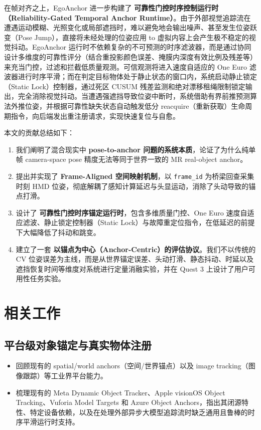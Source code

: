 \documentclass[review]{vgtc}
\begin{document}
在帧对齐之上，EgoAnchor 进一步构建了 \textbf{可靠性门控时序控制运行时（Reliability-Gated Temporal Anchor Runtime）}。由于外部视觉追踪流在遭遇运动模糊、光照变化或局部遮挡时，难以避免地会输出噪声、甚至发生位姿跃变（Pose Jump），直接将未经处理的位姿应用 to 虚拟内容上会产生极不稳定的视觉抖动。EgoAnchor 运行时不依赖复杂的不可预测的时序滤波器，而是通过协同设计多维度的可靠性评分（结合重投影颜色误差、掩膜内深度有效比例及残差等）来充当门控，过滤和拦截低质量观测。可信观测将进入速度自适应的 One Euro 滤波器进行时序平滑；而在判定目标物体处于静止状态的窗口内，系统启动静止锁定（Static Lock）控制器，通过死区 CUSUM 残差监测和绝对漂移租绳限制锁定输出，完全消除视觉抖动。当遭遇强遮挡导致位姿中断时，系统借助有界前推预测算法外推位姿，并根据可靠性缺失状态自动触发低分 reacquire（重新获取）生命周期指令，向后端发出重注册请求，实现快速复位与自愈。

本文的贡献总结如下：
\begin{enumerate}
  \item 我们阐明了混合现实中 \textbf{pose-to-anchor 问题的系统本质}，论证了为什么纯单帧 camera-space pose 精度无法等同于世界一致的 MR real-object anchor。
  \item 提出并实现了 \textbf{Frame-Aligned 空间映射机制}，以 \texttt{frame\_id} 为桥梁回查采集时刻 HMD 位姿，彻底解耦了感知计算延迟与头显运动，消除了头动导致的锚点打滑。
  \item 设计了 \textbf{可靠性门控时序锚定运行时}，包含多维质量门控、One Euro 速度自适应滤波、静止锁定控制器（Static Lock）与故障重定位指令，在低延迟的前提下大幅降低了抖动和跳变。
  \item 建立了一套 \textbf{以锚点为中心（Anchor-Centric）的评估协议}。我们不以传统的 CV 位姿误差为主线，而是从世界锚定误差、头动打滑、静态抖动、时延以及遮挡恢复时间等维度对系统进行定量消融实验，并在 Quest 3 上设计了用户可用性任务实验。
\end{enumerate}

\section{相关工作}

\subsection{平台级对象锚定与真实物体注册}
\begin{itemize}
  \item 回顾现有的 spatial/world anchors（空间/世界锚点）以及 image tracking（图像跟踪）等工业界平台能力。
  \item 梳理现有的 Meta Dynamic Object Tracker、Apple visionOS Object Tracking、Vuforia Model Targets 和 Azure Object Anchors，指出其闭源特性、特定设备依赖，以及在处理外部异步大模型追踪流时缺乏通用且鲁棒的时序平滑运行时支持。
\end{itemize}
\end{document}
